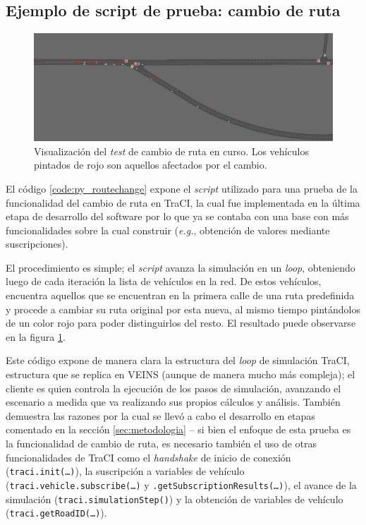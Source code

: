 \subsection{Ejemplo de script de prueba: cambio de ruta}

\begin{figure}
    \centering
    \includegraphics[width=\linewidth]{figuras/network8_routechange.png}
    \caption{Visualización del \emph{test} de cambio de ruta en curso. Los vehículos pintados de rojo son aquellos afectados por el cambio.}
    \label{fig:network8:routechange}
\end{figure}

El código \ref{code:py_routechange} expone el \emph{script} utilizado para una prueba de la funcionalidad del cambio de ruta en TraCI, la cual fue implementada en la última etapa de desarrollo del software por lo que ya se contaba con una base con más funcionalidades sobre la cual construir (\emph{e.g.}, obtención de valores mediante suscripciones).

El procedimiento es simple; el \emph{script} avanza la simulación en un \emph{loop}, obteniendo luego de cada iteración la lista de vehículos en la red. De estos vehículos, encuentra aquellos que se encuentran en la primera calle de una ruta predefinida y procede a cambiar su ruta original por esta nueva, al mismo tiempo pintándolos de un color rojo para poder distinguirlos del resto. El resultado puede observarse en la figura \ref{fig:network8:routechange}.

Este código expone de manera clara la estructura del \emph{loop} de simulación TraCI, estructura que se replica en VEINS (aunque de manera mucho más compleja); el cliente es quien controla la ejecución de los pasos de simulación, avanzando el escenario a medida que va realizando sus propios cálculos y análisis. También demuestra las razones por la cual se llevó a cabo el desarrollo en etapas comentado en la sección \ref{sec:metodologia} -- si bien el enfoque de esta prueba es la funcionalidad de cambio de ruta, es necesario también el uso de otras funcionalidades de TraCI como el \emph{handshake} de inicio de conexión (\texttt{traci.init(\dots)}), la suscripción a variables de vehículo (\texttt{traci.vehicle.subscribe(\dots)} y \texttt{.getSubscriptionResults(\dots)}), el avance de la simulación (\texttt{traci.simulationStep()}) y la obtención de variables de vehículo (\texttt{traci.getRoadID(\dots)}).

\begin{figure}
    \begin{minipage}{\linewidth}
        
    \end{minipage}
\end{figure}

